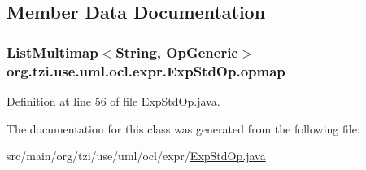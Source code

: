 \subsection{Member Data Documentation}
\hypertarget{classorg_1_1tzi_1_1use_1_1uml_1_1ocl_1_1expr_1_1_exp_std_op_aa5af8e26688221115b96321a98918b4f}{
\subsubsection[{opmap}]{\setlength{\rightskip}{0pt plus 5cm}List\-Multimap$<$String, {\bf Op\-Generic}$>$ org.\-tzi.\-use.\-uml.\-ocl.\-expr.\-Exp\-Std\-Op.\-opmap\hspace{0.3cm}{\ttfamily [static]}}}\label{classorg_1_1tzi_1_1use_1_1uml_1_1ocl_1_1expr_1_1_exp_std_op_aa5af8e26688221115b96321a98918b4f}


Definition at line 56 of file Exp\-Std\-Op.\-java.



The documentation for this class was generated from the following file\-:\begin{DoxyCompactItemize}
\item 
src/main/org/tzi/use/uml/ocl/expr/\hyperlink{_exp_std_op_8java}{Exp\-Std\-Op.\-java}\end{DoxyCompactItemize}
